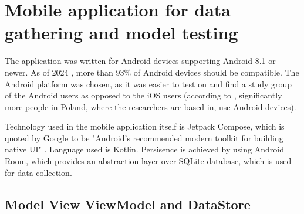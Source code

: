 
\section{Mobile application for data gathering and model testing}

The application was written for Android devices supporting Android 8.1 or newer. As of 2024 \cite{androidStats}, more than 93\% of Android devices should be compatible. The Android platform was chosen, as it was easier to test on and find a study group of the Android users as opposed to the iOS users (according to \cite{operatingSystemDistribution} , significantly more people in Poland, where the researchers are based in, use Android devices).

Technology used in the mobile application itself is Jetpack Compose, which is quoted by Google to be "Android's recommended modern toolkit for building native UI" \cite{jetpackCompose}. Language used is Kotlin. Persisence is achieved by using Android Room, which provides an abstraction layer over SQLite database, which is used for data collection.

\subsection{Model View ViewModel and DataStore}

